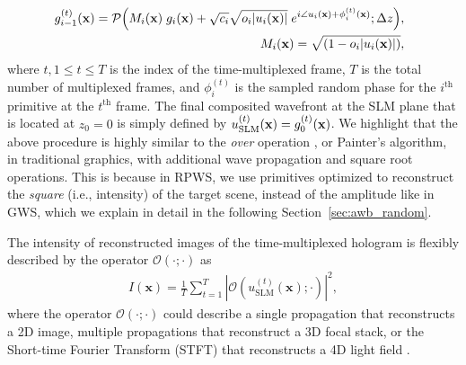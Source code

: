 \begin{align}
    \hspace*{-0.5em}
    g_{i - 1}^{(t)} (\mathbf{x}) = \mathcal{P} \Big( M_i(\mathbf{x}) \; g_i(\mathbf{x}) +  \sqrt{c_i} \sqrt{ o_i |u_i(\mathbf{x})|} \; e^{i \angle u_i(\mathbf{x}) + \phi_i^{(t)}(\mathbf{x})} ; \Delta z\Big)
    \label{eq:gwsplat_random_tm}, \\
    M_i(\mathbf{x}) = \sqrt{(1 - o_{i} |u_i(\mathbf{x})|)},
    \label{eq:gsplat_mask}
\end{align}
where $t, 1\leq t\leq T$ is the index of the time-multiplexed frame, $T$ is the total number of multiplexed frames, and $\phi_i^{(t)}$ is the sampled random phase for the $i^\text{th}$ primitive at the $t^\text{th}$ frame. The final composited wavefront at the SLM plane that is located at $z_0 = 0$ is simply defined by $u_\text{SLM}^{(t)}(\mathbf{x}) = g_0^{(t)}(\mathbf{x})$. We highlight that the above procedure is highly similar to the \textit{over} operation \cite{porter1984over}, or Painter's algorithm, in traditional graphics, with additional wave propagation and square root operations. This is because in RPWS, we use primitives optimized to reconstruct the \textit{square} (i.e., intensity) of the target scene, instead of the amplitude like in GWS, which we explain in detail in the following Section~\ref{sec:awb_random}.

The intensity of reconstructed images of the time-multiplexed hologram is flexibly described by the operator $\mathcal{O(\cdot; \cdot)}$ as
\begin{align}
    I(\mathbf{x})  = \frac{1}{T} \sum_{t=1}^{T} \left| \mathcal{O} \left( u_\text{SLM}^{(t)}(\mathbf{x}); \cdot \right) \right|^2 ,
\end{align}
where the operator $\mathcal{O(\cdot; \cdot)}$ could describe a single propagation that reconstructs a 2D image, multiple propagations that reconstruct a 3D focal stack, or the Short-time Fourier Transform (STFT) that reconstructs a 4D light field \cite{choi2022time}.



